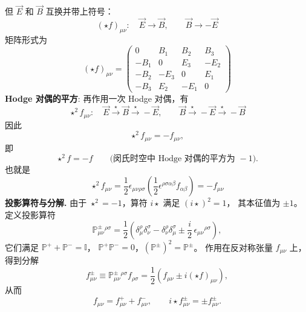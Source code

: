 但 $\vec{E}$ 和 $\vec{B}$ 互换并带上符号：
\begin{equation}
    (\star f)_{\mu\nu}: \quad \vec{E} \to \vec{B}, \qquad \vec{B} \to -\vec{E}
    \label{eq:hodge-EB}
\end{equation}
矩阵形式为
\begin{equation}
    (\star f)_{\mu\nu} = \begin{pmatrix}
    0 & B_1 & B_2 & B_3 \\
    -B_1 & 0 & E_3 & -E_2 \\
    -B_2 & -E_3 & 0 & E_1 \\
    -B_3 & E_2 & -E_1 & 0
    \end{pmatrix}
\end{equation}
\textbf{Hodge 对偶的平方}: 再作用一次 Hodge 对偶，有
\begin{equation}
    \star^2 f_{\mu\nu}:\quad 
    \vec{E} \xrightarrow{\star} \vec{B} \xrightarrow{\star} -\vec{E}, \qquad
    \vec{B} \xrightarrow{\star} -\vec{E} \xrightarrow{\star} -\vec{B}
\end{equation}
因此
\begin{equation}
    \star^2 f_{\mu\nu} = - f_{\mu\nu},
\end{equation}
即
\begin{equation}
    \star^2 f = -f 
    \qquad 
    \bigl(\text{闵氏时空中 Hodge 对偶的平方为 } -1\bigr).
    \label{eq:hodge-squared}
\end{equation}
也就是\[
\star^2 f_{\mu\nu}
= \frac{1}{2}\epsilon_{\mu\nu\rho\sigma}
\left(\frac{1}{2}\epsilon^{\rho\sigma\alpha\beta} f_{\alpha\beta}\right)
= - f_{\mu\nu}
\]
\textbf{投影算符与分解.}
由于 $\star^2 = -1$，算符 $i\star$ 满足 $(i\star)^2 = 1$，
其本征值为 $\pm 1$。定义投影算符
\begin{equation}
\mathbb{P}^\pm_{\mu\nu}{}^{\rho\sigma}
= \frac{1}{2}\left(
\delta^\rho_\mu\delta^\sigma_\nu
- \delta^\rho_\nu\delta^\sigma_\mu
\pm \frac{i}{2}\,\epsilon_{\mu\nu}{}^{\rho\sigma}
\right),
\end{equation}
它们满足 $\mathbb{P}^+ + \mathbb{P}^- = \mathbb{I}$，
$\mathbb{P}^+\mathbb{P}^- = 0$，$(\mathbb{P}^\pm)^2 = \mathbb{P}^\pm$。
作用在反对称张量 $f_{\mu\nu}$ 上，得到分解
\begin{equation}
f^\pm_{\mu\nu}
\equiv \mathbb{P}^\pm_{\mu\nu}{}^{\rho\sigma} f_{\rho\sigma}
= \frac{1}{2}\left(f_{\mu\nu} \pm i(\star f)_{\mu\nu}\right),
\end{equation}
从而
\begin{equation}
f_{\mu\nu} = f^+_{\mu\nu} + f^-_{\mu\nu}, \qquad
i\star f^\pm_{\mu\nu} = \pm f^\pm_{\mu\nu}.
\end{equation}
